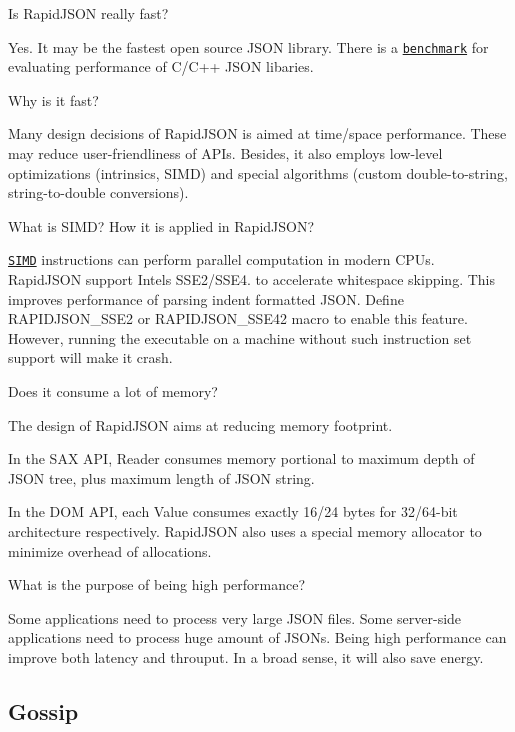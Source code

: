 \begin{DoxyEnumerate}
\item Is Rapid\+J\+S\+ON really fast?

Yes. It may be the fastest open source J\+S\+ON library. There is a \href{https://github.com/miloyip/nativejson-benchmark}{\tt benchmark} for evaluating performance of C/\+C++ J\+S\+ON libaries.
\item Why is it fast?

Many design decisions of Rapid\+J\+S\+ON is aimed at time/space performance. These may reduce user-\/friendliness of A\+P\+Is. Besides, it also employs low-\/level optimizations (intrinsics, S\+I\+MD) and special algorithms (custom double-\/to-\/string, string-\/to-\/double conversions).
\item What is S\+I\+MD? How it is applied in Rapid\+J\+S\+ON?

\href{http://en.wikipedia.org/wiki/SIMD}{\tt S\+I\+MD} instructions can perform parallel computation in modern C\+P\+Us. Rapid\+J\+S\+ON support Intel\textquotesingle{}s S\+S\+E2/\+S\+S\+E4. to accelerate whitespace skipping. This improves performance of parsing indent formatted J\+S\+ON. Define {\ttfamily R\+A\+P\+I\+D\+J\+S\+O\+N\+\_\+\+S\+S\+E2} or {\ttfamily R\+A\+P\+I\+D\+J\+S\+O\+N\+\_\+\+S\+S\+E42} macro to enable this feature. However, running the executable on a machine without such instruction set support will make it crash.
\item Does it consume a lot of memory?

The design of Rapid\+J\+S\+ON aims at reducing memory footprint.

In the S\+AX A\+PI, {\ttfamily Reader} consumes memory portional to maximum depth of J\+S\+ON tree, plus maximum length of J\+S\+ON string.

In the D\+OM A\+PI, each {\ttfamily Value} consumes exactly 16/24 bytes for 32/64-\/bit architecture respectively. Rapid\+J\+S\+ON also uses a special memory allocator to minimize overhead of allocations.
\item What is the purpose of being high performance?

Some applications need to process very large J\+S\+ON files. Some server-\/side applications need to process huge amount of J\+S\+O\+Ns. Being high performance can improve both latency and throuput. In a broad sense, it will also save energy.
\end{DoxyEnumerate}

\subsection*{Gossip}



